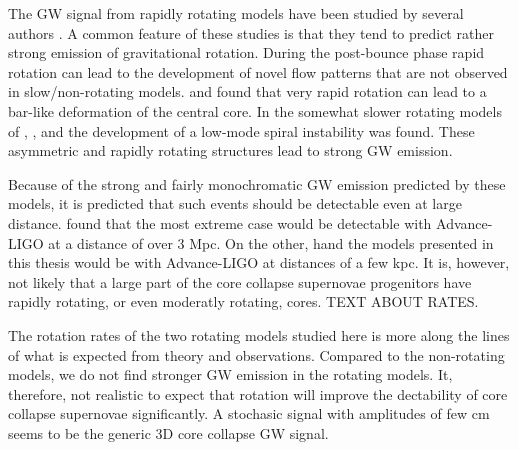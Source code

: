 The GW signal from rapidly rotating models have been studied 
by several authors \citep{mueller_82,rampp_98,shibata_05,ott_05,scheidegger_10,kuroda_14,takiwaki_16}. 
A common feature of these studies is that they tend to predict rather strong emission of
gravitational rotation. During the post-bounce phase rapid rotation can lead to the
development of novel flow patterns that are not observed in slow/non-rotating models.
\cite{rampp_98} and \cite{shibata_05} found that very rapid rotation can
lead to a bar-like deformation of the central core. In the somewhat slower 
rotating models of \cite{ott_05}, \cite{kuroda_14}, and \cite{takiwaki_16} the development of
a low-mode spiral instability was found. These asymmetric and rapidly rotating structures
lead to strong GW emission. 

Because of the strong and fairly monochromatic GW emission predicted by these models,
it is predicted that such events should be detectable even at large distance. \citep{gossan_15} found that the
most extreme case would be detectable with Advance-LIGO at a distance of over 3 Mpc. On the other, hand
the models presented in this thesis would be with Advance-LIGO at distances of a few kpc. 
It is, however, not likely that a large part of the core collapse supernovae progenitors
have rapidly rotating, or even moderatly rotating, cores. TEXT ABOUT RATES.

The rotation rates of the two rotating models studied here is more along the lines of what 
is expected from theory and observations. Compared to the non-rotating models, we do not find stronger GW emission in
the rotating models. It, therefore, not realistic to expect that rotation will improve the 
dectability of core collapse supernovae significantly. A stochasic signal with amplitudes of few cm seems
to be the generic 3D core collapse GW signal.









